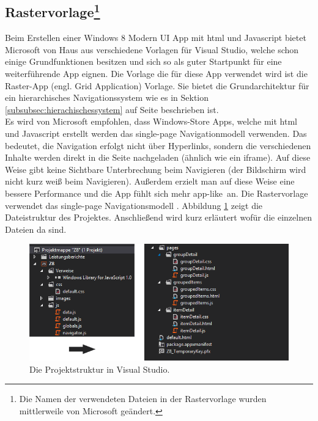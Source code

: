 \documentclass[12pt,a4paper,bibtotoc,abstracton]{scrartcl}
\begin{document}
\subsection[Rastervorlage] {Rastervorlage\footnote{Die Namen der verwendeten Dateien in der Rastervorlage wurden mittlerweile von Microsoft geändert.}}
\label{subsec:rastervorlage}
Beim Erstellen einer Windows 8 Modern UI App mit \ac{html} und Javascript bietet Microsoft von Haus aus verschiedene Vorlagen für Visual Studio, welche schon einige Grundfunktionen besitzen und sich so als guter Startpunkt für eine weiterführende App eignen. Die Vorlage die für diese App verwendet wird ist die Raster-App (engl. Grid Application) Vorlage. Sie bietet die Grundarchitektur für ein hierarchisches Navigationssystem wie es in Sektion \ref{subsubsec:hierachischessystem} auf Seite \pageref{subsubsec:hierachischessystem} beschrieben ist.\\
Es wird von Microsoft empfohlen, dass Windows-Store Apps, welche mit \ac{html} und Javascript erstellt werden das single-page Navigationmodell verwenden. Das bedeutet, die Navigation erfolgt nicht über Hyperlinks, sondern die verschiedenen Inhalte werden direkt in die Seite nachgeladen (ähnlich wie ein iframe). Auf diese Weise gibt keine Sichtbare Unterbrechung beim Navigieren (der Bildschirm wird nicht kurz weiß beim Navigieren). Außerdem erzielt man auf diese Weise eine bessere Performance und die App fühlt sich mehr \glqq app-like\grqq\ an. Die Rastervorlage verwendet das single-page Navigationsmodell \citep{MicrosoftSinglePage2013}. Abbildung \ref{fig:projektmappe} zeigt die Dateistruktur des Projektes. Anschließend wird kurz erläutert wofür die einzelnen Dateien da sind.

\begin{figure}[h]
	\centering
	\includegraphics[width=\textwidth]{Bilder/Screenshots/app/projektmappe.png} 
	\caption{Die Projektstruktur in Visual Studio.}
	\label{fig:projektmappe}
\end{figure}
\end{document}
